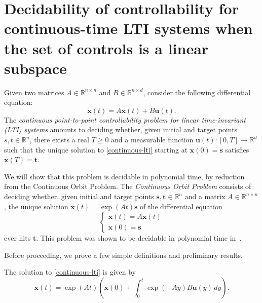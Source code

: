 \section{Decidability of controllability for continuous-time LTI systems when the set of controls is a linear subspace}

\label{continuous-decidability}

Given two matrices $A \in \mathbb{R}^{n \times n}$ and $B \in \mathbb{R}^{n \times d}$, consider the following differential equation:
\begin{equation}
\label{continuous-lti}
\dot{\boldsymbol{x}}(t) = A \boldsymbol{x}(t) + B \boldsymbol{u}(t) .
\end{equation}
The \emph{continuous point-to-point controllability problem for linear time-invariant (LTI) systems} amounts to deciding whether, given initial and target points $s,t \in \mathbb{R}^{n}$, there exists a real $T\geq 0$ and a measurable function $\boldsymbol{u}(t) : [0,T] \rightarrow \mathbb{R}^{d}$ such that the unique solution to \cref{continuous-lti} starting at $\boldsymbol{x}(0) = \boldsymbol{s}$ satisfies $\boldsymbol{x}(T) = \boldsymbol{t}$.

We will show that this problem is decidable in polynomial time, by reduction from the Continuous Orbit Problem. The \emph{Continuous Orbit Problem} consists of deciding whether, given initial and target points $\boldsymbol{s}, \boldsymbol{t} \in \mathbb{R}^{n}$ and a matrix $A \in \mathbb{R}^{n \times n}$, the unique solution $\boldsymbol{x}(t) = \exp(A t) \boldsymbol{s}$ of the differential equation
\begin{equation}
\begin{cases}
\dot{\boldsymbol{x}}(t) = A \boldsymbol{x}(t) \\
\boldsymbol{x}(0) = \boldsymbol{s}
\end{cases}
\end{equation}
ever hits $\boldsymbol{t}$. This problem was shown to be decidable in polynomial time in~\cite{ContinuousSkolem1, ContinuousSkolem2}.

Before proceeding, we prove a few simple definitions and preliminary results.

\begin{lemma}
\label{closed-form-solution}
The solution to \cref{continuous-lti} is given by
\begin{equation*}
\boldsymbol{x}(t) = \exp(At) \left( \boldsymbol{x}(0) + \int_{0}^{t} \exp(-Ay) B \boldsymbol{u}(y) \, dy \right).
\end{equation*}
\end{lemma}

